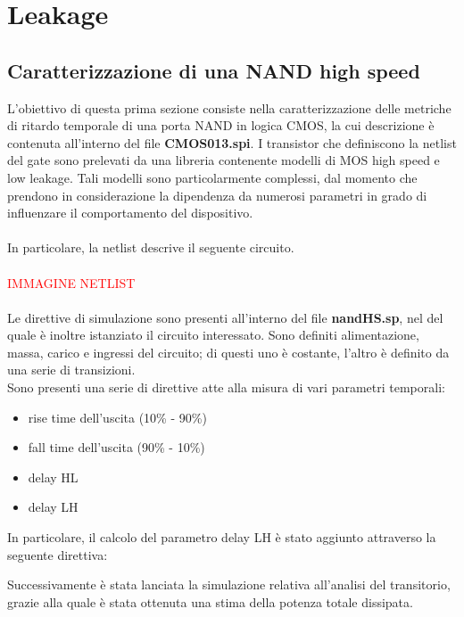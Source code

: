 \documentclass[11pt,  english, makeidx, a4paper, titlepage, oneside]{book}
\newenvironment{listato}{\footnotesize} {\normalsize }
\begin{document}
\chapter{Leakage}
\section{Caratterizzazione di una NAND high speed}
L'obiettivo di questa prima sezione consiste nella caratterizzazione delle metriche di ritardo temporale di una porta NAND in logica CMOS, la cui descrizione è contenuta all'interno del file \textbf{CMOS013.spi}.
I transistor che definiscono la netlist del gate sono prelevati da una libreria contenente modelli di MOS high speed e low leakage. Tali modelli sono particolarmente complessi, dal momento che prendono in considerazione la dipendenza da numerosi parametri in grado di influenzare il comportamento del dispositivo.
\\\\
In particolare, la netlist descrive il seguente circuito.
\\\\
\textcolor{red}{IMMAGINE NETLIST}
\\\\
Le direttive di simulazione sono presenti all'interno del file \textbf{nandHS.sp}, nel del quale è inoltre istanziato il circuito interessato. Sono definiti alimentazione, massa, carico e ingressi del circuito; di questi uno è costante, l'altro è definito da una serie di transizioni.
\\
Sono presenti una serie di direttive atte alla misura di vari parametri temporali:
\begin{itemize}
\item rise time dell'uscita (10\% - 90\%)
\item fall time dell'uscita (90\% - 10\%)
\item delay HL
\item delay LH
\end{itemize}
In particolare, il calcolo del parametro delay LH è stato aggiunto attraverso la seguente direttiva:
\begin{center}
\begin{listato}
	\centerline{}
\end{listato}
\end{center}
\vspace{0.3cm}
Successivamente è stata lanciata la simulazione relativa all'analisi del transitorio, grazie alla quale è stata ottenuta una stima della potenza totale dissipata.
\end{document}
